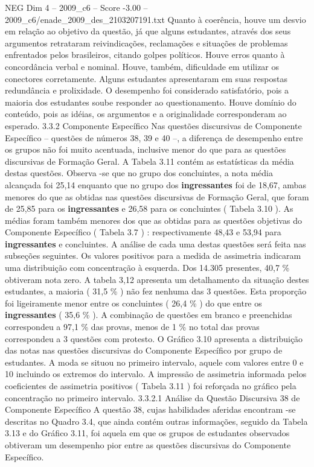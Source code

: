 \begin{textsample}{NEG Dim 4 – 2009\_c6 – Score -3.00 – 2009\_c6/enade\_2009\_des\_2103207191.txt}
Quanto à coerência, houve um desvio em relação ao objetivo da questão, já que alguns estudantes, através dos seus argumentos retrataram reivindicações, reclamações e situações de problemas enfrentados pelos brasileiros, citando golpes políticos.
Houve erros quanto à concordância verbal e nominal.
Houve, também, dificuldade em utilizar os conectores corretamente.
Alguns estudantes apresentaram em suas respostas redundância e prolixidade.
O desempenho foi considerado satisfatório, pois a maioria dos estudantes soube responder ao questionamento.
Houve domínio do conteúdo, pois as idéias, os argumentos e a originalidade corresponderam ao esperado. 3.3.2 Componente Específico Nas questões discursivas de Componente Específico – questões de números 38, 39 e 40 –, a diferença de desempenho entre os grupos não foi muito acentuada, inclusive menor do que para as questões discursivas de Formação Geral.
A Tabela 3.11 contém as estatísticas da média destas questões.
Observa -se que no grupo dos concluintes, a nota média alcançada foi 25,14 enquanto que no grupo dos \textbf{ingressantes} foi de 18,67, ambas menores do que as obtidas nas questões discursivas de Formação Geral, que foram de 25,85 para os \textbf{ingressantes} e 26,58 para os concluintes ( Tabela 3.10 ).
As médias foram também menores dos que as obtidas para as questões objetivas do Componente Específico ( Tabela 3.7 ) : respectivamente 48,43 e 53,94 para \textbf{ingressantes} e concluintes.
A análise de cada uma destas questões será feita nas subseções seguintes.
Os valores positivos para a medida de assimetria indicaram uma distribuição com concentração à esquerda.
Dos 14.305 presentes, 40,7 \% obtiveram nota zero.
A tabela 3,12 apresenta um detalhamento da situação destes estudantes, a maioria ( 31,5 \% ) não fez nenhuma das 3 questões.
Esta proporção foi ligeiramente menor entre os concluintes ( 26,4 \% ) do que entre os \textbf{ingressantes} ( 35,6 \% ).
A combinação de questões em branco e preenchidas correspondeu a 97,1 \% das provas, menos de 1 \% no total das provas correspondeu a 3 questões com protesto.
O Gráfico 3.10 apresenta a distribuição das notas nas questões discursivas do Componente Específico por grupo de estudantes.
A moda se situou no primeiro intervalo, aquele com valores entre 0 e 10 incluindo os extremos do intervalo.
A impressão de assimetria informada pelos coeficientes de assimetria positivos ( Tabela 3.11 ) foi reforçada no gráfico pela concentração no primeiro intervalo. 3.3.2.1 Análise da Questão Discursiva 38 de Componente Específico A questão 38, cujas habilidades aferidas encontram -se descritas no Quadro 3.4, que ainda contém outras informações, seguido da Tabela 3.13 e do Gráfico 3.11, foi aquela em que os grupos de estudantes observados obtiveram um desempenho pior entre as questões discursivas do Componente Específico.

\end{textsample}
